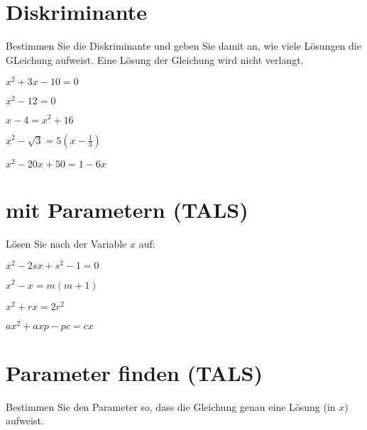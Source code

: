 \section{Diskriminante}
Bestimmen Sie die Diskriminante und geben Sie damit an, wie viele
Lösungen die GLeichung aufweist. Eine Lösung der Gleichung wird nicht
verlangt.


\begin{bbwAufgabenBlock}
\item $ x^2 + 3x - 10= 0$

\item $ x^2 - 12= 0$

\item $ x-4= x^2 + 16$

\item $ x^2 - \sqrt{3} = 5(x-\frac13)$

\item $ x^2 - 20x + 50 = 1 - 6x$




\end{bbwAufgabenBlock}
\newpage

\section{mit Parametern (TALS)}
Lösen Sie nach der Variable $x$ auf:

\begin{bbwAufgabenBlock}
\item $ x^2 - 2sx + s^2 -1 = 0$

\item $ x^2 - x= m(m+1)$

\item $ x^2 + rx = 2r^2 $

\item $ ax^2 + axp - pc = cx$


\end{bbwAufgabenBlock}
\newpage
\section{Parameter finden (TALS)}
Bestimmen Sie den Parameter so, dass die Gleichung genau eine Lösung
(in $x$) aufweist.

